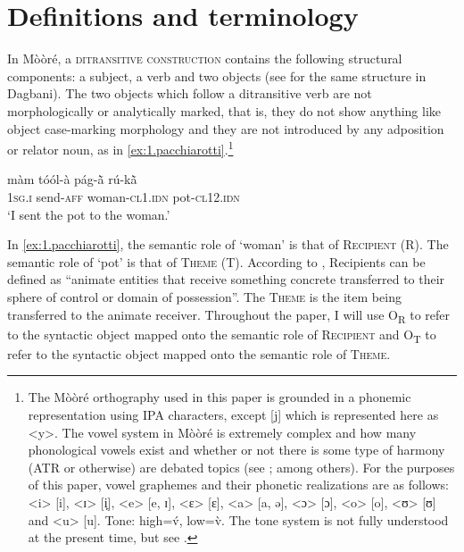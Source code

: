 \documentclass[output=paper]{langsci/langscibook}
\begin{document}
\section{Definitions and terminology}\label{§2:definitions.pacchiarotti}

In M\`{o}\`{o}r\'{e}, a \textsc{ditransitive construction} contains the following structural components: a subject, a verb and two objects (see \citealt{olawsky1999} for the same structure in Dagbani). The two objects which follow a ditransitive verb are not morphologically or analytically marked, that is, they do not show anything like object case-marking morphology and they are not introduced by any adposition or relator noun, as in \ref{ex:1.pacchiarotti}.\footnote{The M\`{o}\`{o}r\'{e} orthography used in this paper is grounded in a phonemic representation using IPA characters, except [j] which is represented here as {\textless}y{\textgreater}. The vowel system in M\`{o}\`{o}r\'{e} is extremely complex and how many phonological vowels exist and whether or not there is some type of harmony (ATR or otherwise) are debated topics (see \citealt{peterson1971,canu1974,rennison1990,nikiema2000,calamaibertinetto2005}; among others). For the purposes of this paper, vowel graphemes and their phonetic realizations are as follows: {\textless}i{\textgreater} [i], {\textless}ɪ{\textgreater} [i̙], {\textless}e{\textgreater} [e, ɪ], {\textless}ɛ{\textgreater} [ɛ], {\textless}a{\textgreater} [a, ə], {\textless}ɔ{\textgreater} [ɔ], {\textless}o{\textgreater} [o], {\textless}ʊ{\textgreater} [ʊ] and {\textless}u{\textgreater} [u]. Tone: high=\'{v}, low=\`{v}. The tone system is not fully understood at the present time, but see \citet{peterson1971}.}

\ea
\label{ex:1.pacchiarotti}
\gll m\`{a}m    t\'{o}\'{o}l-\`{a}        p\'{a}g-\`{\~{a}}             r\'{u}-k\`{\~{a}}\\
\textsc{1sg.i}    send-\textsc{aff}      woman-\textsc{cl1.idn}       pot-\textsc{cl12.idn} \\
\glt `I sent the pot to the woman.'  
\z

In \ref{ex:1.pacchiarotti}, the semantic role of `woman' is that of \textsc{Recipient} (R).  The semantic role of `pot' is that of \textsc{Theme} (T). According to \citet[274]{kittila2005}, Recipients can be defined as ``animate entities that receive something concrete transferred to their sphere of control or domain of possession''. The \textsc{Theme} is the item being transferred to the animate receiver. Throughout the paper, I will use O\textsubscript{R} to refer to the syntactic object mapped onto the semantic role of \textsc{Recipient} and O\textsubscript{T} to refer to the syntactic object mapped onto the semantic role of \textsc{Theme}. 
\end{document}
